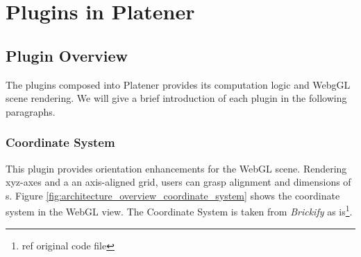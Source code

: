 \documentclass[../ClassicThesis.tex]{subfiles}
\begin{document}



\section{Plugins in Platener}

\subsection{Plugin Overview}


The plugins composed into Platener provides its computation logic and WebgGL
scene rendering. We will give a brief introduction of each plugin in the
following paragraphs.

\subsubsection{Coordinate System}

This plugin provides orientation enhancements for the WebGL scene. Rendering
xyz-axes and a an axis-aligned grid, users can grasp alignment and dimensions of
{\threedmodel}s. Figure \ref{fig:architecture_overview_coordinate_system} shows
the coordinate system in the WebGL view. The Coordinate System is taken from
\emph{Brickify} as is\footnote{ref original code file}.
\end{document}
